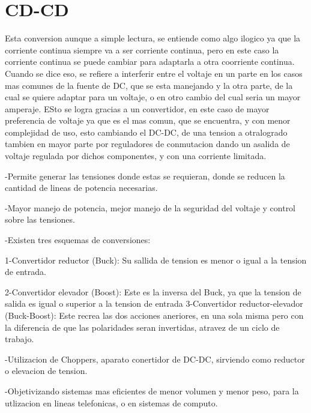 \documentclass[12pt]{article}
\begin{document}
 
 \section{CD-CD}
 Esta conversion aunque a simple lectura, se entiende como algo ilogico ya que la corriente continua siempre va a ser corriente continua, pero en este caso la corriente continua se puede cambiar para adaptarla a otra coorriente continua. Cuando se dice eso, se refiere a interferir entre el voltaje en un parte en los casos mas comunes de la fuente de DC, que se esta manejando y la otra parte, de la cual se quiere adaptar para un voltaje, o en otro cambio del cual seria un mayor amperaje. ESto se logra gracias a un convertidor, en este caso de mayor preferencia de voltaje ya que es el mas comun, que se encuentra, y con menor complejidad de uso, esto cambiando el DC-DC, de una tension a otralogrado tambien en mayor parte por reguladores de conmutacion dando un asalida de voltaje regulada por dichos componentes, y con una corriente limitada.
 
 -Permite generar las tensiones donde estas se requieran, donde se reducen la cantidad de lineas de potencia necesarias.
 
 -Mayor manejo de potencia, mejor manejo de la seguridad del voltaje y control sobre las tensiones.
 
 -Existen tres esquemas de conversiones: 
 
 1-Convertidor reductor (Buck): Su sallida de tension es menor o igual a la tension de entrada.
 
 2-Convertidor elevador (Boost): Este es la inversa del Buck, ya que la tension de salida es igual o superior a la tension de entrada
 3-Convertidor reductor-elevador (Buck-Boost): Este recrea las dos acciones aneriores, en una sola misma pero con la diferencia de que las polaridades seran invertidas, atravez de un ciclo de trabajo.
 
 -Utilizacion de Choppers, aparato conertidor de DC-DC, sirviendo como reductor o elevacion de tension.
 
 -Objetivizando sistemas mas eficientes de menor volumen y menor peso, para la utlizacion en lineas telefonicas, o en sistemas de computo.
 
 
\end{document}
